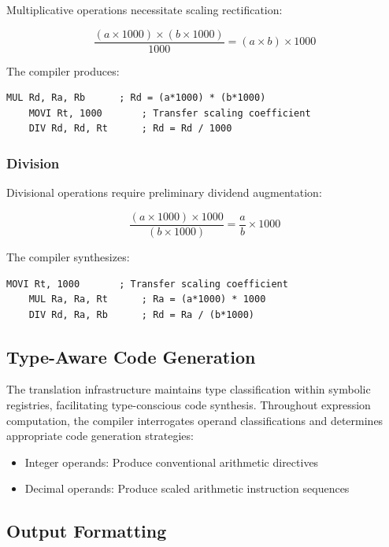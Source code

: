 \documentclass[conference,10pt,twocolumn]{IEEEtran}
\begin{document}
Multiplicative operations necessitate scaling rectification:

\begin{equation}
\frac{(a \times 1000) \times (b \times 1000)}{1000} = (a \times b) \times 1000
\end{equation}

The compiler produces:
\begin{lstlisting}[language={[x86masm]Assembler}, basicstyle=\small\ttfamily]
    MUL Rd, Ra, Rb      ; Rd = (a*1000) * (b*1000)
    MOVI Rt, 1000       ; Transfer scaling coefficient
    DIV Rd, Rd, Rt      ; Rd = Rd / 1000
\end{lstlisting}

\subsubsection{Division}

Divisional operations require preliminary dividend augmentation:

\begin{equation}
\frac{(a \times 1000) \times 1000}{(b \times 1000)} = \frac{a}{b} \times 1000
\end{equation}

The compiler synthesizes:
\begin{lstlisting}[language={[x86masm]Assembler}, basicstyle=\small\ttfamily]
    MOVI Rt, 1000       ; Transfer scaling coefficient
    MUL Ra, Ra, Rt      ; Ra = (a*1000) * 1000
    DIV Rd, Ra, Rb      ; Rd = Ra / (b*1000)
\end{lstlisting}

\subsection{Type-Aware Code Generation}

The translation infrastructure maintains type classification within symbolic registries, facilitating type-conscious code synthesis. Throughout expression computation, the compiler interrogates operand classifications and determines appropriate code generation strategies:

\begin{itemize}
\item Integer operands: Produce conventional arithmetic directives
\item Decimal operands: Produce scaled arithmetic instruction sequences
\end{itemize}

\subsection{Output Formatting}
\end{document}
